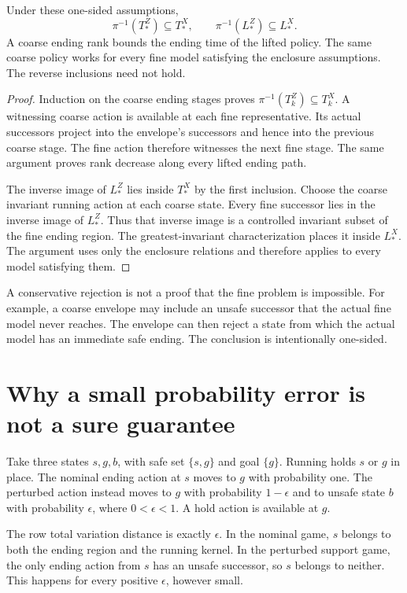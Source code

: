 \begin{proposition}\label{r:control-envelope}
Under these one-sided assumptions,
\[
 \pi^{-1}(T^Z_*)\subseteq T^X_*,\qquad
 \pi^{-1}(L^Z_*)\subseteq L^X_*.
\]
A coarse ending rank bounds the ending time of the lifted policy. The same coarse policy works for every fine model satisfying the enclosure assumptions. The reverse inclusions need not hold.
\end{proposition}
\begin{proof}
Induction on the coarse ending stages proves
$\pi^{-1}(T^Z_k)\subseteq T^X_k$. A witnessing coarse action is available at each fine representative. Its actual successors project into the envelope's successors and hence into the previous coarse stage. The fine action therefore witnesses the next fine stage. The same argument proves rank decrease along every lifted ending path.

The inverse image of $L^Z_*$ lies inside $T^X_*$ by the first inclusion. Choose the coarse invariant running action at each coarse state. Every fine successor lies in the inverse image of $L^Z_*$. Thus that inverse image is a controlled invariant subset of the fine ending region. The greatest-invariant characterization places it inside $L^X_*$. The argument uses only the enclosure relations and therefore applies to every model satisfying them.
\end{proof}

A conservative rejection is not a proof that the fine problem is impossible. For example, a coarse envelope may include an unsafe successor that the actual fine model never reaches. The envelope can then reject a state from which the actual model has an immediate safe ending. The conclusion is intentionally one-sided.

\section{Why a small probability error is not a sure guarantee}
Take three states $s,g,b$, with safe set $\{s,g\}$ and goal $\{g\}$. Running holds $s$ or $g$ in place. The nominal ending action at $s$ moves to $g$ with probability one. The perturbed action instead moves to $g$ with probability $1-\epsilon$ and to unsafe state $b$ with probability $\epsilon$, where $0<\epsilon<1$. A hold action is available at $g$.

The row total variation distance is exactly $\epsilon$. In the nominal game, $s$ belongs to both the ending region and the running kernel. In the perturbed support game, the only ending action from $s$ has an unsafe successor, so $s$ belongs to neither. This happens for every positive $\epsilon$, however small.

